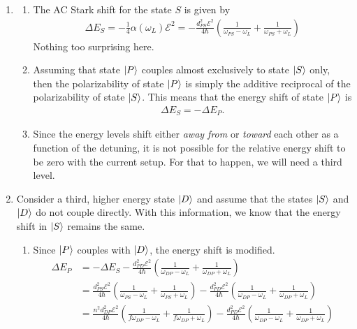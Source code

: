 \documentclass{article}
\theoremstyle{definition}
\newcommand{\al}{\alpha}
\newcommand{\f}[2]{\frac{#1}{#2}}
\newcommand{\lp}{\left(}
\newcommand{\rp}{\right)}
\begin{document}
\begin{enumerate}[label=(\alph*)]
	\item 
	
	\begin{enumerate}[label=(\roman*)]
		\item The AC Stark shift for the state $S$ is given by 
		\begin{align*}
			\Delta E_S = -\f{1}{4}\al(\omega_L) \mathcal{E}^2 = -\f{d_{PS}^2\mathcal{E}^2}{4\hbar}\lp \f{1}{\omega_{PS} - \omega_L} + \f{1}{\omega_{PS} + \omega_L} \rp
		\end{align*}
		Nothing too surprising here.
		
		\item Assuming that state $\ket{P}$ couples almost exclusively to state $\ket{S}$ only, then the polarizability of state $\ket{P}$ is simply the additive reciprocal of the polarizability of state $\ket{S}$. This means that the energy shift of state $\ket{P}$ is 
		\begin{align*}
		\Delta E_S = -\Delta E_P.
		\end{align*}
		
		\item Since the energy levels shift either \textit{away from} or \textit{toward} each other as a function of the detuning, it is not possible for the relative energy shift to be zero with the current setup. For that to happen, we will need a third level.
	\end{enumerate}
	
	\item Consider a third, higher energy state $\ket{D}$ and assume that the states $\ket{S}$ and $\ket{D}$ do not couple directly. With this information, we know that the energy shift in $\ket{S}$ remains the same. 
	
	\begin{enumerate}[label=(\roman*)]
		\item Since $\ket{P}$ couples with $\ket{D}$, the energy shift is modified. 
		\begin{align*}
		\Delta E_P &= -\Delta E_S -\f{d_{PD}^2 \mathcal{E}^2}{4\hbar}\lp \f{1}{\omega_{DP} - \omega_L} + \f{1}{\omega_{DP} + \omega_L} \rp\\
		&= \f{d_{PS}^2\mathcal{E}^2}{4\hbar}\lp \f{1}{\omega_{PS} - \omega_L} + \f{1}{\omega_{PS} + \omega_L} \rp -\f{d_{PD}^2 \mathcal{E}^2}{4\hbar}\lp \f{1}{\omega_{DP} - \omega_L} + \f{1}{\omega_{DP} + \omega_L} \rp\\
		&= \f{n^2d_{DP}^2\mathcal{E}^2}{4\hbar}\lp \f{1}{f\omega_{DP} - \omega_L} + \f{1}{f\omega_{DP} + \omega_L} \rp -\f{d_{PD}^2 \mathcal{E}^2}{4\hbar}\lp \f{1}{\omega_{DP} - \omega_L} + \f{1}{\omega_{DP} + \omega_L} \rp
		\end{align*}
		

\end{enumerate}
\end{enumerate}
\end{document}
